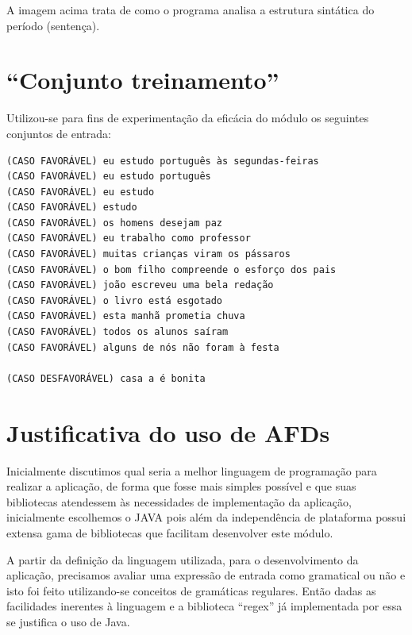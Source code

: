 \documentclass[12pt,a4paper,oneside,english,brazilian,brazil]{abntex2}
\begin{document}
A imagem acima trata de como o programa analisa a estrutura sintática do período (sentença).

\section{``Conjunto treinamento''}

Utilizou-se para fins de experimentação da eficácia do módulo os seguintes conjuntos de entrada:

\setlength{\parindent}{0cm}
\hrulefill
\setlength{\parindent}{1.25cm}	
\begin{verbatim}
(CASO FAVORÁVEL) eu estudo português às segundas-feiras
(CASO FAVORÁVEL) eu estudo português
(CASO FAVORÁVEL) eu estudo
(CASO FAVORÁVEL) estudo
(CASO FAVORÁVEL) os homens desejam paz
(CASO FAVORÁVEL) eu trabalho como professor
(CASO FAVORÁVEL) muitas crianças viram os pássaros
(CASO FAVORÁVEL) o bom filho compreende o esforço dos pais
(CASO FAVORÁVEL) joão escreveu uma bela redação
(CASO FAVORÁVEL) o livro está esgotado
(CASO FAVORÁVEL) esta manhã prometia chuva
(CASO FAVORÁVEL) todos os alunos saíram
(CASO FAVORÁVEL) alguns de nós não foram à festa

(CASO DESFAVORÁVEL) casa a é bonita

\end{verbatim}

\setlength{\parindent}{0cm}
\hrulefill
\setlength{\parindent}{1.25cm}	

\section{Justificativa do uso de AFDs}
 
\par Inicialmente discutimos qual seria a melhor linguagem de programação para realizar a aplicação, de forma que fosse mais simples possível e que suas bibliotecas atendessem às necessidades de implementação da aplicação, inicialmente escolhemos o JAVA pois além da independência de plataforma possui extensa gama de bibliotecas que facilitam desenvolver este módulo.\

\par A partir da definição da linguagem utilizada, para o desenvolvimento da aplicação, precisamos avaliar uma expressão de entrada como gramatical ou não e isto foi feito utilizando-se conceitos de gramáticas regulares. Então dadas as facilidades inerentes à linguagem e a biblioteca ``regex'' já implementada por essa se justifica o uso de Java. \
\end{document}
